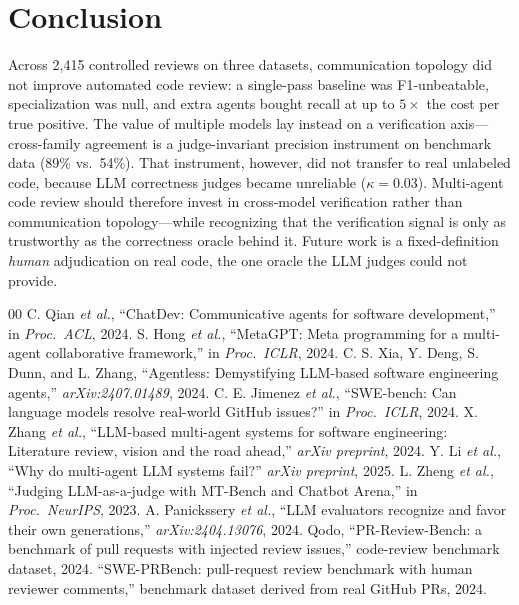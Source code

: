 \documentclass[conference]{IEEEtran}
\begin{document}
\section{Conclusion}
Across 2{,}415 controlled reviews on three datasets, communication topology did
not improve automated code review: a single-pass baseline was F1-unbeatable,
specialization was null, and extra agents bought recall at up to $5\times$ the
cost per true positive. The value of multiple models lay instead on a
verification axis---cross-family agreement is a judge-invariant precision
instrument on benchmark data (89\% vs.\ 54\%). That instrument, however, did not
transfer to real unlabeled code, because LLM correctness judges became unreliable
($\kappa{=}0.03$). Multi-agent code review should therefore invest in cross-model
verification rather than communication topology---while recognizing that the
verification signal is only as trustworthy as the correctness oracle behind it.
Future work is a fixed-definition \emph{human} adjudication on real code, the one
oracle the LLM judges could not provide.

\begin{thebibliography}{00}
 C. Qian \emph{et al.}, ``ChatDev: Communicative agents for
software development,'' in \emph{Proc.\ ACL}, 2024.
 S. Hong \emph{et al.}, ``MetaGPT: Meta programming for a
multi-agent collaborative framework,'' in \emph{Proc.\ ICLR}, 2024.
 C. S. Xia, Y. Deng, S. Dunn, and L. Zhang, ``Agentless:
Demystifying LLM-based software engineering agents,'' \emph{arXiv:2407.01489},
2024.
 C. E. Jimenez \emph{et al.}, ``SWE-bench: Can language models
resolve real-world GitHub issues?'' in \emph{Proc.\ ICLR}, 2024.
 X. Zhang \emph{et al.}, ``LLM-based multi-agent systems for
software engineering: Literature review, vision and the road ahead,''
\emph{arXiv preprint}, 2024.
 Y. Li \emph{et al.}, ``Why do multi-agent LLM systems fail?''
\emph{arXiv preprint}, 2025.
 L. Zheng \emph{et al.}, ``Judging LLM-as-a-judge with MT-Bench
and Chatbot Arena,'' in \emph{Proc.\ NeurIPS}, 2023.
 A. Panickssery \emph{et al.}, ``LLM evaluators recognize and
favor their own generations,'' \emph{arXiv:2404.13076}, 2024.
 Qodo, ``PR-Review-Bench: a benchmark of pull requests with
injected review issues,'' code-review benchmark dataset, 2024.
 ``SWE-PRBench: pull-request review benchmark with human reviewer
comments,'' benchmark dataset derived from real GitHub PRs, 2024.
\end{thebibliography}
\end{document}
